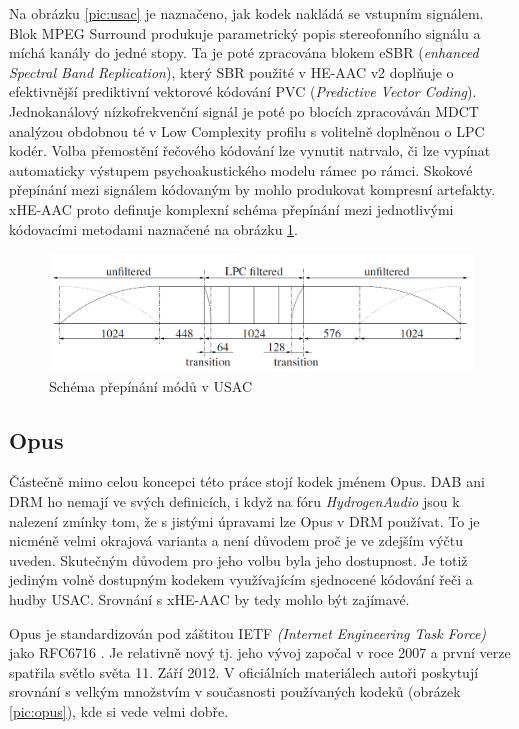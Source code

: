 Na obrázku \ref{pic:usac} je naznačeno, jak kodek nakládá se vstupním signálem. Blok MPEG Surround produkuje parametrický popis stereofonního signálu a míchá kanály do jedné stopy. Ta je poté zpracována blokem eSBR (\textit{enhanced Spectral Band Replication}), který SBR použité v HE-AAC v2 doplňuje o efektivnější prediktivní vektorové kódování PVC (\textit{Predictive Vector Coding}). Jednokanálový nízkofrekvenční signál je poté po blocích zpracováván MDCT analýzou obdobnou té v Low Complexity profilu s volitelně doplněnou o LPC kodér. Volba přemostění řečového kódování lze vynutit natrvalo, či lze vypínat automaticky výstupem psychoakustického modelu rámec po rámci. Skokové přepínání mezi signálem kódovaným by mohlo produkovat kompresní artefakty. xHE-AAC proto definuje komplexní schéma přepínání mezi jednotlivými kódovacími metodami naznačené na obrázku \ref{pic:usac:switching}.

    \begin{figure}[h]
        \centering
        \includegraphics[width=.6\textwidth]{pic/switching.png}
        \caption{Schéma přepínání módů v USAC \cite{article:usac}}
        \label{pic:usac:switching}
    \end{figure}


\subsection{Opus}

Částečně mimo celou koncepci této práce stojí kodek jménem Opus. DAB ani DRM ho nemají ve svých definicích, i když na fóru \textit{HydrogenAudio} \cite{forum:hydro} jsou k nalezení zmínky tom, že s jistými úpravami lze Opus v DRM používat. To je nicméně velmi okrajová varianta a není důvodem proč je ve zdejším výčtu uveden. Skutečným důvodem pro jeho volbu byla jeho dostupnost. Je totiž jediným volně dostupným kodekem využívajícím sjednocené kódování řeči a hudby USAC. Srovnání s xHE-AAC by tedy mohlo být zajímavé.

Opus je standardizován pod záštitou IETF \textit{(Internet Engineering Task Force)} jako RFC6716 \cite{norm:opus}. Je relativně nový tj. jeho vývoj započal v roce 2007 a první verze spatřila světlo světa 11. Září 2012. V oficiálních materiálech autoři poskytují srovnání s velkým množstvím v současnosti používaných kodeků (obrázek \ref{pic:opus}), kde si vede velmi dobře.


